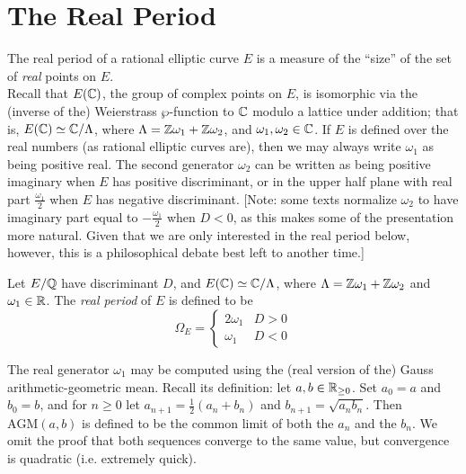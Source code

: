\documentclass[10pt]{article}
\newcommand{\AGM}{\text{AGM}}
\begin{document}
\newpage
\section{The Real Period}

The real period of a rational elliptic curve $E$ is a measure of the ``size'' of the set of {\it real} points on $E$. \\

Recall that $E(\mathbb{C})$, the group of complex points on $E$, is isomorphic via the (inverse of the) Weierstrass $\wp$-function to $\mathbb{C}$ modulo a lattice under addition; that is, $E(\mathbb{C}) \simeq \mathbb{C}/\Lambda$, where $\Lambda = \mathbb{Z}\omega_1 + \mathbb{Z}\omega_2$, and $\omega_1,\omega_2 \in \mathbb{C}$.
If $E$ is defined over the real numbers (as rational elliptic curves are), then we may always write $\omega_1$ as being positive real. The second generator $\omega_2$ can be written as being positive imaginary when $E$ has positive discriminant, or in the upper half plane with real part $\frac{\omega_1}{2}$ when $E$ has negative discriminant. [Note: some texts normalize $\omega_2$ to have imaginary part equal to $-\frac{\omega_1}{2}$ when $D<0$, as this makes some of the presentation more natural. Given that we are only interested in the real period below, however, this is a philosophical debate best left to another time.]

\begin{definition}
Let $E/\mathbb{Q}$ have discriminant $D$, and $E(\mathbb{C}) \simeq \mathbb{C}/\Lambda$, where $\Lambda = \mathbb{Z}\omega_1 + \mathbb{Z}\omega_2$ and $\omega_1 \in \mathbb{R}$. The {\it real period} of $E$ is defined to be
\begin{equation}
\Omega_E = \begin{cases} 2\omega_1 & D > 0 \\ \omega_1 & D < 0 \end{cases}
\end{equation}
\end{definition}

The real generator $\omega_1$ may be computed using the (real version of the) Gauss arithmetic-geometric mean. Recall its definition: let $a,b \in \mathbb{R}_{\ge0}$. Set $a_0 = a$ and $b_0 = b$, and for $n\ge 0$ let $a_{n+1} = \frac{1}{2}(a_{n}+b_{n})$ and $b_{n+1} = \sqrt{a_{n}b_{n}}$. Then $\AGM(a,b)$ is defined to be the common limit of both the $a_n$ and the $b_n$. We omit the proof that both sequences converge to the same value, but convergence is quadratic (i.e. extremely quick).
\end{document}
